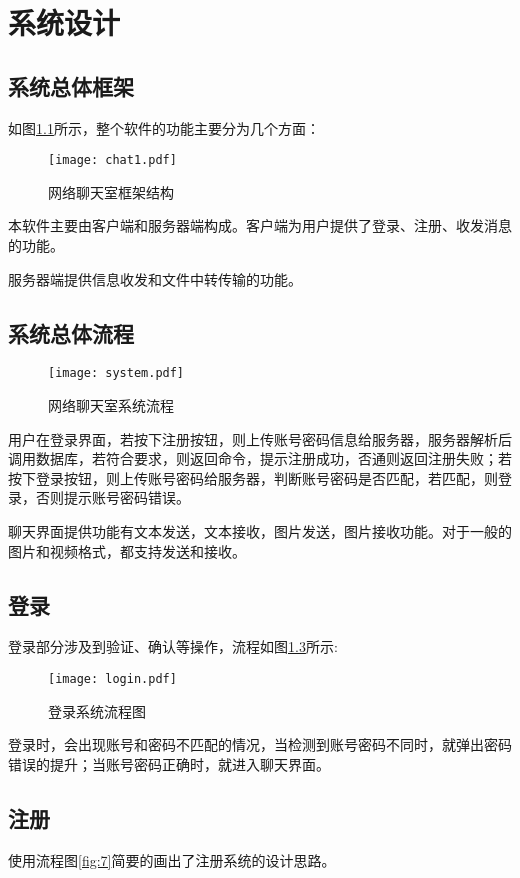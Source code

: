 \documentclass[forprint]{OSPaper}
\begin{document}
\chapter{系统设计}
\section{系统总体框架}
如图\ref{fig:5}所示，整个软件的功能主要分为几个方面：

\begin{figure}[!htbp]
	\centering
	\texttt{[image: chat1.pdf]}
	\caption{网络聊天室框架结构}
	\label{fig:5}
\end{figure}

本软件主要由客户端和服务器端构成。客户端为用户提供了登录、注册、收发消息的功能。

服务器端提供信息收发和文件中转传输的功能。

\section{系统总体流程}

\begin{figure}[!ht]
	\centering
	\texttt{[image: system.pdf]}
	\caption{网络聊天室系统流程}
	\label{fig:14}
\end{figure}

用户在登录界面，若按下注册按钮，则上传账号密码信息给服务器，服务器解析后调用数据库，若符合要求，则返回命令，提示注册成功，否通则返回注册失败；若按下登录按钮，则上传账号密码给服务器，判断账号密码是否匹配，若匹配，则登录，否则提示账号密码错误。

聊天界面提供功能有文本发送，文本接收，图片发送，图片接收功能。对于一般的图片和视频格式，都支持发送和接收。

\section{登录}
登录部分涉及到验证、确认等操作，流程如图\ref{fig:6}所示:

\begin{figure}[!ht]
	\centering
	\texttt{[image: login.pdf]}
	\caption{登录系统流程图}
	\label{fig:6}
\end{figure}

登录时，会出现账号和密码不匹配的情况，当检测到账号密码不同时，就弹出密码错误的提升；当账号密码正确时，就进入聊天界面。

\section{注册}
使用流程图\ref{fig:7}简要的画出了注册系统的设计思路。
\end{document}
